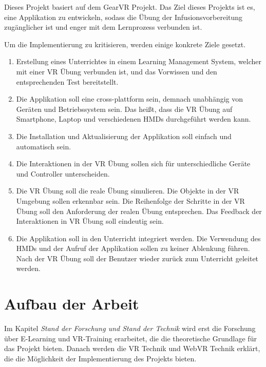Dieses Projekt basiert auf dem GearVR Projekt. Das Ziel dieses Projekts ist es, eine Applikation zu entwickeln, sodass die Übung der Infusionsvorbereitung zugänglicher ist und enger mit dem Lernprozess verbunden ist.

Um die Implementierung zu kritisieren, werden einige konkrete Ziele gesetzt.

\begin{enumerate}[labelsep=1ex]
	\renewcommand{\labelenumi}{\textbf{Z\theenumi.}}
	\item Erstellung eines Unterrichtes in einem Learning Management System, welcher mit einer VR Übung verbunden ist, und das Vorwissen und den entsprechenden Test bereitstellt.
	
	\item Die Applikation soll eine cross-plattform sein, demnach unabhängig von Geräten und Betriebssystem sein. Das heißt, dass die VR Übung auf Smartphone, Laptop und verschiedenen HMDs durchgeführt werden kann.
	
	\item Die Installation und Aktualisierung der Applikation soll einfach und automatisch sein.
	
	\item Die Interaktionen in der VR Übung sollen sich für unterschiedliche Geräte und Controller unterscheiden.
	
	\item Die VR Übung soll die reale Übung simulieren. Die Objekte in der VR Umgebung sollen erkennbar sein. Die Reihenfolge der Schritte in der VR Übung soll den Anforderung der realen Übung entsprechen. Das Feedback der Interaktionen in VR Übung soll eindeutig sein.
	
	\item Die Applikation soll in den Unterricht integriert werden. Die Verwendung des HMDs und der Aufruf der Applikation sollen zu keiner Ablenkung führen. Nach der VR Übung soll der Benutzer wieder zurück zum Unterricht geleitet werden.
	
\end{enumerate}

\section{Aufbau der Arbeit}
Im Kapitel {\em Stand der Forschung und Stand der Technik} wird erst die Forschung über E-Learning und VR-Training erarbeitet, die die theoretische Grundlage für das Projekt bieten. Danach werden die VR Technik und WebVR Technik erklärt, die die Möglichkeit der Implementierung des Projekts bieten.

